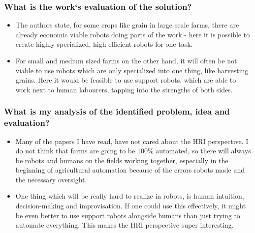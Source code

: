 \documentclass{article}
\begin{document}
\subsubsection*{What is the work`s evaluation of the solution?}
\begin{itemize}
    \item The authors state, for some crops like grain in large scale farms, there are already economic viable robots doing parts of the work - here it is possible to create highly specialized, high efficient robots for one task.
    \item For small and medium sized farms on the other hand, it will often be not viable to use robots which are only specialized into one thing, like harvesting grains. Here it would be feasible to use support robots, which are able to work next to human labourers, tapping into the strengths of both sides.
\end{itemize}
\subsubsection*{What is my analysis of the identified problem, idea and evaluation?}
\begin{itemize}
    \item Many of the papers I have read, have not cared about the HRI perspective. I do not think that farms are going to be 100\% automated, so there will always be robots and humans on the fields working together, especially in the beginning of agricultural automation because of the errors robots made and the necessary oversight.
    \item One thing which will be really hard to realize in robots, is human intuition, decision-making and improvisation. If one could use this effectively, it might be even better to use support robots alongside humans than just trying to automate everything. This makes the HRI perspective super interesting.
\end{itemize}
\end{document}
